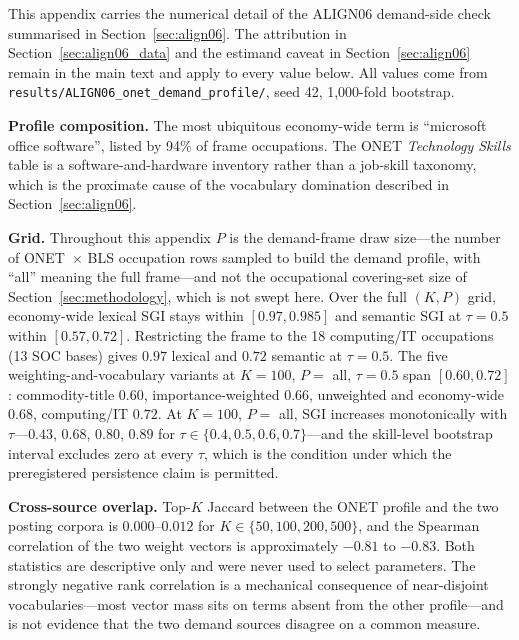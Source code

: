 \documentclass[journal]{IEEEtran}
\begin{document}
This appendix carries the numerical detail of the ALIGN06 demand-side check summarised in Section~\ref{sec:align06}. The attribution in Section~\ref{sec:align06_data} and the estimand caveat in Section~\ref{sec:align06} remain in the main text and apply to every value below. All values come from \texttt{results/ALIGN06\_onet\_demand\_profile/}, seed 42, 1,000-fold bootstrap.

\textbf{Profile composition.} The most ubiquitous economy-wide term is ``microsoft office software'', listed by 94\% of frame occupations. The O\*NET \textit{Technology Skills} table is a software-and-hardware inventory rather than a job-skill taxonomy, which is the proximate cause of the vocabulary domination described in Section~\ref{sec:align06}.

\textbf{Grid.} Throughout this appendix $P$ is the demand-frame draw size---the number of O\*NET~$\times$ BLS occupation rows sampled to build the demand profile, with ``all'' meaning the full frame---and not the occupational covering-set size of Section~\ref{sec:methodology}, which is not swept here. Over the full $(K, P)$ grid, economy-wide lexical SGI stays within $[0.97, 0.985]$ and semantic SGI at $\tau = 0.5$ within $[0.57, 0.72]$. Restricting the frame to the 18 computing/IT occupations (13 SOC bases) gives $0.97$ lexical and $0.72$ semantic at $\tau = 0.5$. The five weighting-and-vocabulary variants at $K = 100$, $P = $ all, $\tau = 0.5$ span $[0.60, 0.72]$: commodity-title $0.60$, importance-weighted $0.66$, unweighted and economy-wide $0.68$, computing/IT $0.72$. At $K = 100$, $P = $ all, SGI increases monotonically with $\tau$---$0.43$, $0.68$, $0.80$, $0.89$ for $\tau \in \{0.4, 0.5, 0.6, 0.7\}$---and the skill-level bootstrap interval excludes zero at every $\tau$, which is the condition under which the preregistered persistence claim is permitted.

\textbf{Cross-source overlap.} Top-$K$ Jaccard between the O\*NET profile and the two posting corpora is $0.000$--$0.012$ for $K \in \{50, 100, 200, 500\}$, and the Spearman correlation of the two weight vectors is approximately $-0.81$ to $-0.83$. Both statistics are descriptive only and were never used to select parameters. The strongly negative rank correlation is a mechanical consequence of near-disjoint vocabularies---most vector mass sits on terms absent from the other profile---and is not evidence that the two demand sources disagree on a common measure.
\end{document}
